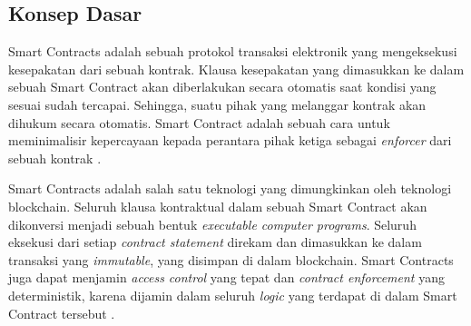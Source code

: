 \subsection{Konsep Dasar}
\label{subsec:konsep-dasar}

Smart Contracts adalah sebuah protokol transaksi elektronik yang mengeksekusi kesepakatan dari sebuah kontrak. Klausa kesepakatan yang dimasukkan ke dalam sebuah Smart Contract akan diberlakukan secara otomatis saat kondisi yang sesuai sudah tercapai. Sehingga, suatu pihak yang melanggar kontrak akan dihukum secara otomatis. Smart Contract adalah sebuah cara untuk meminimalisir kepercayaan kepada perantara pihak ketiga sebagai \textit{enforcer} dari sebuah kontrak \parencite{szabo1997formalizing}.

Smart Contracts adalah salah satu teknologi yang dimungkinkan oleh teknologi blockchain. Seluruh klausa kontraktual dalam sebuah Smart Contract akan dikonversi menjadi sebuah bentuk \textit{executable computer programs}. Seluruh eksekusi dari setiap \textit{contract statement} direkam dan dimasukkan ke dalam transaksi yang \textit{immutable}, yang disimpan di dalam blockchain. Smart Contracts juga dapat menjamin \textit{access control} yang tepat dan \textit{contract enforcement} yang deterministik, karena dijamin dalam seluruh \textit{logic} yang terdapat di dalam Smart Contract tersebut \parencite{zheng2020overview}.

